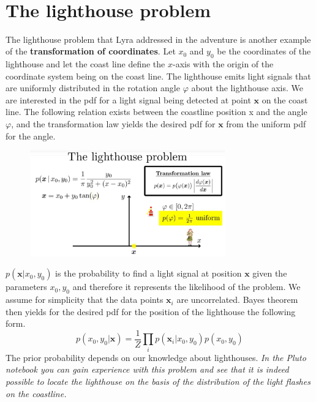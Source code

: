 \documentclass[12pt, a4paper]{scrartcl}
\begin{document}
\\


\section*{The lighthouse problem}
The lighthouse problem that Lyra addressed in the adventure is another
example of the  \textbf{transformation of coordinates}. Let $x_0$ and $y_0$ be the coordinates
of the lighthouse and let the coast line define the $x$-axis with the origin of
the coordinate system being on the coast line.
The lighthouse emits light signals that are uniformly distributed in the rotation angle $\varphi$ about the lighthouse axis. We are interested in the pdf for a
light signal being detected at point $\boldsymbol{x}$ on the coast line.
The following relation exists between the coastline position x and the
angle $\varphi$, and the transformation law yields the desired pdf for $\boldsymbol{x}$ from the uniform pdf for
the angle.\\ %
 \begin{figure}[H]
	\centering
	\includegraphics[width=0.75\textwidth]{8_10.png}
\end{figure}

$p(\boldsymbol{x}|x_0,y_0)$ is the probability to find a light signal at position $\boldsymbol{x}$ given the parameters
$x_0,y_0$ and therefore it represents the likelihood of the problem.
We assume for simplicity that the data points $\boldsymbol{x}_i$ are uncorrelated. Bayes
theorem then yields for the desired pdf for the position of the lighthouse the following form.
\[p(x_0,y_0|\boldsymbol{x})=\frac 1Z \prod_i p(\boldsymbol{x}_i|x_0,y_0)p(x_0,y_0)\]
The prior probability depends on our knowledge about lighthouses.
\textit{In the Pluto notebook you can gain experience with this problem and see that
it is indeed possible to locate the lighthouse on the basis of the distribution
of the light ﬂashes on the coastline.}
\end{document}
